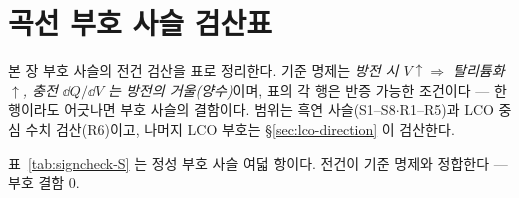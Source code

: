 \appendix
\section{곡선 부호 사슬 검산표}\label{sec:signcheck}
본 장 부호 사슬의 전건 검산을 표로 정리한다. 기준 명제는 \emph{방전 시 $V\!\uparrow\Rightarrow$
탈리튬화$\uparrow$, 충전 $\dd Q/\dd V$ 는 방전의 거울(양수)}이며, 표의 각 행은 반증 가능한 조건이다 ---
한 행이라도 어긋나면 부호 사슬의 결함이다. 범위는 흑연 사슬(S1--S8$\cdot$R1--R5)과 LCO 중심 수치
검산(R6)이고, 나머지 LCO 부호는 \S\ref{sec:lco-direction} 이 검산한다.

표~\ref{tab:signcheck-S} 는 정성 부호 사슬 여덟 항이다. 전건이 기준 명제와 정합한다 --- 부호 결함 $0$.

